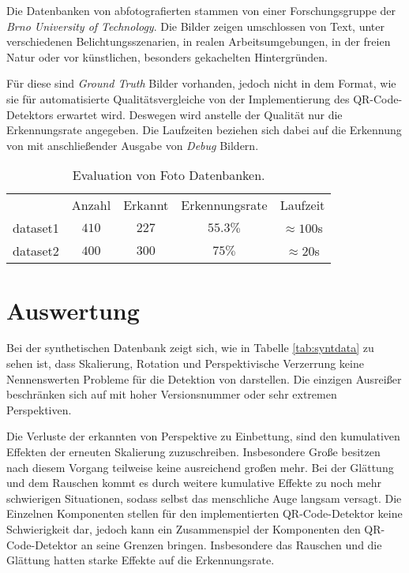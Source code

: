 \noindent Die Datenbanken von abfotografierten \QRCodes \cite{databasebrno} stammen von einer Forschungsgruppe der \emph{Brno University of Technology}. Die Bilder zeigen \QRCodes umschlossen von Text, unter verschiedenen Belichtungsszenarien, in realen Arbeitsumgebungen, in der freien Natur oder vor künstlichen, besonders gekachelten Hintergründen.

Für diese \QRCodes sind \emph{Ground Truth} Bilder vorhanden, jedoch nicht in dem Format, wie sie für automatisierte Qualitätsvergleiche von der Implementierung des QR-Code-Detektors erwartet wird. Deswegen wird anstelle der Qualität nur die Erkennungsrate angegeben. Die Laufzeiten beziehen sich dabei auf die Erkennung von \QRCodes mit anschließender Ausgabe von \emph{Debug} Bildern.

\begin{table}[h]
\centering
\begin{tabular}{l c c c c}
 		& Anzahl & Erkannt & Erkennungsrate & Laufzeit \\
		dataset1 & $410$ & $227$ & $55.3\%$ & $\approx100$s \\
		dataset2 & $400$ & $300$ & $75\%$ & $\approx20$s \\
\end{tabular}
\caption{Evaluation von Foto Datenbanken.}
\label{tab:fotodata}
\end{table}

\newpage
\section{Auswertung}
Bei der synthetischen Datenbank zeigt sich, wie in Tabelle \ref{tab:syntdata} zu sehen ist, dass Skalierung, Rotation und Perspektivische Verzerrung keine Nennenswerten Probleme für die Detektion von \QRCodes darstellen. Die einzigen Ausreißer beschränken sich auf \QRCodes mit hoher Versionsnummer oder sehr extremen Perspektiven.

Die Verluste der erkannten \QRCodes von Perspektive zu Einbettung, sind den kumulativen Effekten der erneuten Skalierung zuzuschreiben. Insbesondere Große \QRCodes besitzen nach diesem Vorgang teilweise keine ausreichend großen \fps mehr.
Bei der Glättung und dem Rauschen kommt es durch weitere kumulative Effekte zu noch mehr schwierigen Situationen, sodass selbst das menschliche Auge langsam versagt.
Die Einzelnen Komponenten stellen für den implementierten QR-Code-Detektor keine Schwierigkeit dar, jedoch kann ein Zusammenspiel der Komponenten den QR-Code-Detektor an seine Grenzen bringen. Insbesondere das Rauschen und die Glättung hatten starke Effekte auf die Erkennungsrate.

